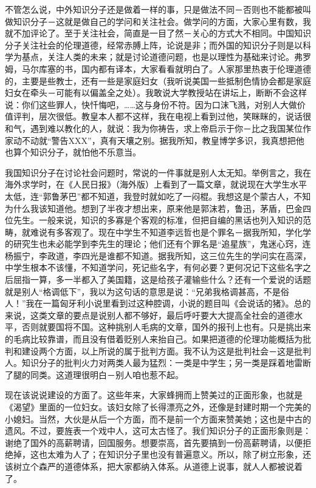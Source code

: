 不管怎么说，中外知识分子还是做着一样的事，只是做法不同－否则也不能都被叫做知识分子－这就是做自己的学问和关注社会。做学问的方面，大家心里有数，我就不加评论了。至于关注社会，简直是一目了然－关心的方式大不相同。中国知识分子关注社会的伦理道德，经常赤膊上阵，论说是非；而外国的知识分子则是以科学为基点，关注人类的未来；就是讨论道德问题，也是以理性为基础来讨论。弗罗姆，马尔库塞的书，国内都有译本，大家看看就明白了。人家那里热衷于伦理道德的，主要是些教士，还有一些是家庭妇女（我听说美国一些抵制色情协会都是家庭妇女在牵头－可能有以偏盖全之处）。我敢说大学教授站在讲坛上，断断不会这样说：你们这些罪人，快忏悔吧，……这与身份不符。因为口沫飞溅，对别人大做价值评判，层次很低。教皇本人都不这样，我在电视上看到过他，笑眯眯的，说话很和气，遇到难以教化的人，就说：我为你祷告，求上帝启示于你－比之我国某位作家动不动就“警告XXX”，真有天壤之别。据我所知，教皇博学多识，我真想把他也算个知识分子，就怕他不乐意当。 

我国知识分子在讨论社会问题时，常说的一件事就是别人太无知。举例言之，我在海外求学时，在《人民日报》（海外版）上看到了一篇文章，就说现在大学生水平太低，连“郭鲁茅巴”都不知道，我登时就如吃了一闷棍。我想这是个蒙古人，不知为什么我该知道他。想到了半夜才想出来，原来他是郭沫若，鲁迅，茅盾，巴金四位先生。一般来说，知识的多寡是个客观的标准，但把自编的黑话也列入知识的范畴，就难说有多客观了。现在中学生不知道李远哲也是个罪名－据我所知，学化学的研究生也未必能学到李先生的理论；他们还有个罪名是“追星族”，鬼迷心窍，连杨振宁，李政道，李四光是谁都不知道。据我所知，这三位先生的学问实在高深，中学生根本不该懂，不知道学问，死记些名字，有何必要？更何况记下这些名字之后屈指一算，多一半都入了美国籍，这是给孩子灌输些什么？还有一个爱说的话题就是别人“格调低下”，我以为这句话的意思是说：“兄弟我格调甚高，不是俗人！”我在一篇匈牙利小说里看到过这种腔调，小说的题目叫《会说话的猪》。总的来说，这类文章的要点是说别人都不够好，最后呼吁要大大提高全社会的道德水平，否则就要国将不国。这种挑别人毛病的文章，国外的报刊上也有。只是挑出来的毛病比较靠谱，而且没有借着贬别人来抬自己。如果把道德的伦理功能概括为批判和建设两个方面，以上所说的属于批判方面。我不认为这是批判社会－这是批判人。知识分子的批判火力对两类人最为猛烈：一类是中学生；另一类是踩着地雷断了腿的同类。这道理很明白－别人咱也惹不起。 

现在该说说建设的方面了。这些年来，大家蜂拥而上赞美过的正面形象，也就是《渴望》里面的一位妇女。该妇女除了长得漂亮之外，还像是封建时期一个完美的小媳妇。当然，大伙是从后一个方面，而不是前一个方面来赞美她；这也是中古的遗风。不过，要旌表一个戏中人，这可太古怪了。我们知识分子的正面形象则是：谢绝了国外的高薪聘请，回国服务。想要崇高，首先要搞到一份高薪聘请，以便拒绝掉，这也太难为人了；在知识分子里也没有普遍意义。所以，除了树立形象，还该树立个森严的道德体系，把大家都纳入体系。从道德上说事，就人人都被说着了。 

